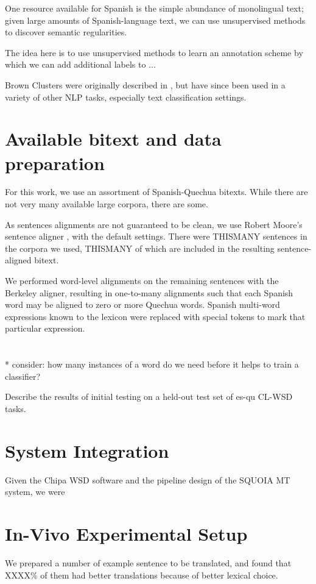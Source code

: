 \documentclass[10pt, a4paper]{article}
\begin{document}
One resource available for Spanish is the simple abundance of monolingual text;
given large amounts of Spanish-language text, we can use unsupervised methods
to discover semantic regularities.


The idea here is to use unsupervised methods to learn an annotation scheme by
which we can add additional labels to ...

Brown Clusters were originally described in \cite{Brown92class-basedn-gram},
but have since been used in a variety of other NLP tasks, especially text
classification settings.


\section{Available bitext and data preparation}
For this work, we use an assortment of Spanish-Quechua bitexts.
While there are not very many available large corpora, there are some.

As sentences alignments are not guaranteed to be clean, we use Robert Moore's
sentence aligner \cite{DBLP:conf/amta/Moore02}, with the default settings.
There were THISMANY sentences in the corpora we used, THISMANY of which are
included in the resulting sentence-aligned bitext.

We performed word-level alignments on the remaining sentences with the Berkeley
aligner, resulting in one-to-many alignments such that each Spanish word may be
aligned to zero or more Quechua words. Spanish multi-word expressions known to
the lexicon were replaced with special tokens to mark that particular
expression.

\section{}
* consider: how many instances of a word do we need before it helps to train a
classifier?


Describe the results of initial testing on a held-out test set of es-qu CL-WSD
tasks.


\section{System Integration}
Given the Chipa WSD software and the pipeline design of the SQUOIA MT system,
we were

\section{In-Vivo Experimental Setup}
We prepared a number of example sentence to be translated, and found that
XXXX\% of them had better translations because of better lexical choice.
\end{document}
